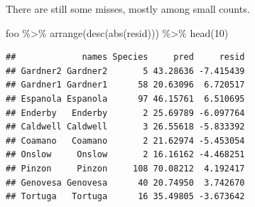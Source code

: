 \documentclass[
  ignorenonframetext,
]{beamer}
\newenvironment{Shaded}{\begin{snugshade}}{\end{snugshade}}
\newcommand{\DecValTok}[1]{\textcolor[rgb]{0.00,0.00,0.81}{#1}}
\newcommand{\FunctionTok}[1]{\textcolor[rgb]{0.00,0.00,0.00}{#1}}
\newcommand{\NormalTok}[1]{#1}
\newcommand{\SpecialCharTok}[1]{\textcolor[rgb]{0.00,0.00,0.00}{#1}}
\begin{document}
\begin{frame}[fragile]{}
\protect\hypertarget{section-19}{}
There are still some misses, mostly among small counts.

\vspace{12pt}
\tiny

\begin{Shaded}
\begin{Highlighting}[]
\NormalTok{foo }\SpecialCharTok{\%\textgreater{}\%} \FunctionTok{arrange}\NormalTok{(}\FunctionTok{desc}\NormalTok{(}\FunctionTok{abs}\NormalTok{(resid))) }\SpecialCharTok{\%\textgreater{}\%} \FunctionTok{head}\NormalTok{(}\DecValTok{10}\NormalTok{)}
\end{Highlighting}
\end{Shaded}

\begin{verbatim}
##             names Species     pred     resid
## Gardner2 Gardner2       5 43.28636 -7.415439
## Gardner1 Gardner1      58 20.63096  6.720517
## Espanola Espanola      97 46.15761  6.510695
## Enderby   Enderby       2 25.69789 -6.097764
## Caldwell Caldwell       3 26.55618 -5.833392
## Coamano   Coamano       2 21.62974 -5.453054
## Onslow     Onslow       2 16.16162 -4.468251
## Pinzon     Pinzon     108 70.08212  4.192417
## Genovesa Genovesa      40 20.74950  3.742670
## Tortuga   Tortuga      16 35.49805 -3.673642
\end{verbatim}
\end{frame}
\end{document}
